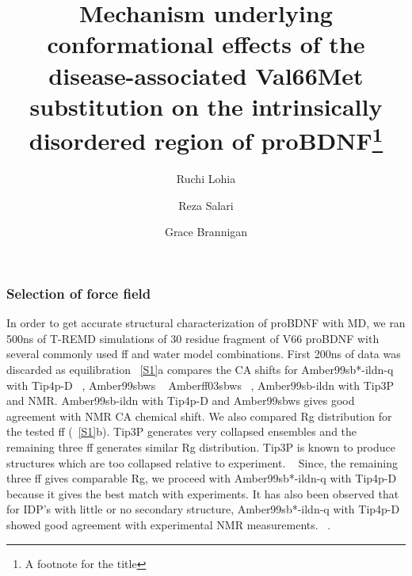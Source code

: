 \documentclass[journal=jacsat,manuscript=article]{achemso}
\author{Ruchi Lohia}
\author{Reza Salari}
\author{Grace Brannigan}
\affiliation[Rutgers University]
{Center for Computational and Integrative Biology, Rutgers University, Camden, NJ, USA}
\title[An \textsf{achemso} demo]
  {Mechanism underlying conformational effects of the disease-associated Val66Met substitution on the intrinsically disordered region of proBDNF\footnote{A footnote for the title}}
\begin{document}
\renewcommand{\thepage}{S\arabic{page}}  
\renewcommand{\thesection}{S\arabic{section}}   
\renewcommand{\thetable}{S\arabic{table}}   
\renewcommand{\figurename}{}
\renewcommand{\thefigure}{Fig S\arabic{figure}}

\subsubsection*{Selection of force field}
In order to get accurate structural characterization of proBDNF with MD,  we ran  500ns of T-REMD simulations of 30 residue fragment of V66 proBDNF with several commonly used ff and water model combinations. First 200ns of data was discarded as equilibration ~\ref{S1}a compares the CA shifts for  Amber99sb*-ildn-q ~\cite {Lindorff-Larsen2010a, Hornak2006a} with Tip4p-D ~\cite {Piana2015},  Amber99sbws ~\cite {Lindorff-Larsen2010a, Best2014} Amberff03sbws  ~\cite {Best2009, Best2014}, Amber99sb-ildn with Tip3P ~\cite {Jorgensen1981} and NMR.  Amber99sb-ildn with Tip4p-D and Amber99sbws gives good agreement with NMR CA chemical shift.  We also compared Rg distribution for the tested ff (~\ref{S1}b).  Tip3P generates very collapsed ensembles and the remaining three ff generates similar Rg distribution. Tip3P is known to produce structures which are too collapsed relative to experiment. ~\cite {Piana2015, Best2014, Mercadante2015} Since, the remaining three ff gives comparable Rg, we proceed with Amber99sb*-ildn-q with Tip4p-D because it gives the best match with experiments. It has also been observed that for IDP's with little or no secondary structure,  Amber99sb*-ildn-q with Tip4p-D showed good agreement with experimental NMR measurements. ~\cite {Robustelli2018}.
\end{document}

